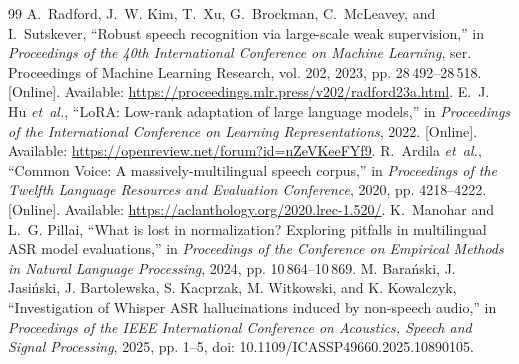 \begin{thebibliography}{99}
A.~Radford, J.~W. Kim, T.~Xu, G.~Brockman, C.~McLeavey, and I.~Sutskever, ``{Robust speech recognition via large-scale weak supervision},'' in \emph{Proceedings of the 40th International Conference on Machine Learning}, ser. Proceedings of Machine Learning Research, vol. 202, 2023, pp. 28\,492--28\,518. [Online]. Available: \url{https://proceedings.mlr.press/v202/radford23a.html}.
\BIBentrySTDinterwordspacing
{}
\BIBentryALTinterwordspacing
E.~J. Hu \emph{et~al.}, ``{LoRA: Low-rank adaptation of large language models},'' in \emph{Proceedings of the International Conference on Learning Representations}, 2022. [Online]. Available: \url{https://openreview.net/forum?id=nZeVKeeFYf9}.
\BIBentrySTDinterwordspacing
{}
R.~Ardila \emph{et~al.}, ``Common Voice: A massively-multilingual speech corpus,'' in \emph{Proceedings of the Twelfth Language Resources and Evaluation Conference}, 2020, pp. 4218--4222. [Online]. Available: \url{https://aclanthology.org/2020.lrec-1.520/}.
K.~Manohar and L.~G. Pillai, ``{What is lost in normalization? Exploring pitfalls in multilingual ASR model evaluations},'' in \emph{Proceedings of the Conference on Empirical Methods in Natural Language Processing}, 2024, pp. 10\,864--10\,869.
 M. Bara\'nski, J. Jasi\'nski, J. Bartolewska, S. Kacprzak, M. Witkowski, and K. Kowalczyk, ``Investigation of Whisper ASR hallucinations induced by non-speech audio,'' in \textit{Proceedings of the IEEE International Conference on Acoustics, Speech and Signal Processing}, 2025, pp. 1--5, doi: 10.1109/ICASSP49660.2025.10890105.
\end{thebibliography}
